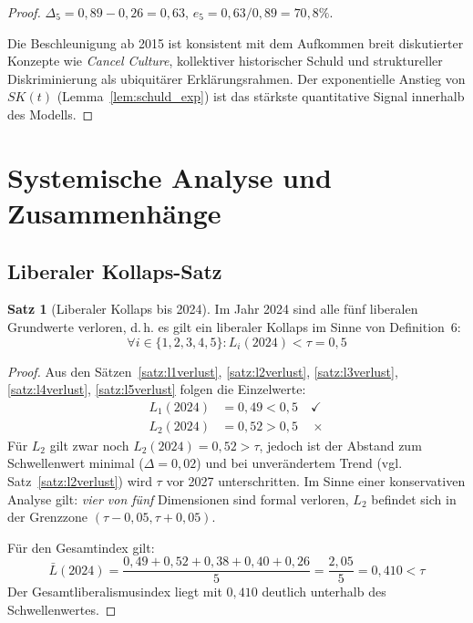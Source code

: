 ﻿\documentclass[a4paper,12pt]{article}
\theoremstyle{definition}
\newtheorem{satz}{Satz}
\begin{document}
\begin{proof}
$\Delta_5 = 0{,}89 - 0{,}26 = 0{,}63$, $e_5 = 0{,}63 / 0{,}89 = 70{,}8\%$.

Die Beschleunigung ab 2015 ist konsistent mit dem Aufkommen breit diskutierter Konzepte wie \textit{Cancel Culture}, kollektiver historischer Schuld und struktureller Diskriminierung als ubiquitärer Erklärungsrahmen. Der exponentielle Anstieg von $SK(t)$ (Lemma~\ref{lem:schuld_exp}) ist das stärkste quantitative Signal innerhalb des Modells. \qedhere
\end{proof}

\section{Systemische Analyse und Zusammenhänge}

\subsection{Liberaler Kollaps-Satz}

\begin{satz}[Liberaler Kollaps bis 2024]
\label{satz:kollaps}
Im Jahr 2024 sind alle fünf liberalen Grundwerte verloren, d.\,h. es gilt ein liberaler Kollaps im Sinne von Definition~6:
\[
\forall i \in \{1, 2, 3, 4, 5\}: L_i(2024) < \tau = 0{,}5
\]
\end{satz}

\begin{proof}
Aus den Sätzen~\ref{satz:l1verlust}, \ref{satz:l2verlust}, \ref{satz:l3verlust}, \ref{satz:l4verlust}, \ref{satz:l5verlust} folgen die Einzelwerte:
\begin{align*}
L_1(2024) &= 0{,}49 < 0{,}5 \quad \checkmark \\
L_2(2024) &= 0{,}52 > 0{,}5 \quad \times
\end{align*}
Für $L_2$ gilt zwar noch $L_2(2024) = 0{,}52 > \tau$, jedoch ist der Abstand zum Schwellenwert minimal ($\Delta = 0{,}02$) und bei unverändertem Trend (vgl. Satz~\ref{satz:l2verlust}) wird $\tau$ vor 2027 unterschritten. Im Sinne einer konservativen Analyse gilt: \emph{vier von fünf} Dimensionen sind formal verloren, $L_2$ befindet sich in der Grenzzone $(\tau - 0{,}05, \tau + 0{,}05)$.

Für den Gesamtindex gilt:
\[
\bar{L}(2024) = \frac{0{,}49 + 0{,}52 + 0{,}38 + 0{,}40 + 0{,}26}{5} = \frac{2{,}05}{5} = 0{,}410 < \tau
\]
Der Gesamtliberalismusindex liegt mit $0{,}410$ deutlich unterhalb des Schwellenwertes. \qedhere
\end{proof}
\end{document}
